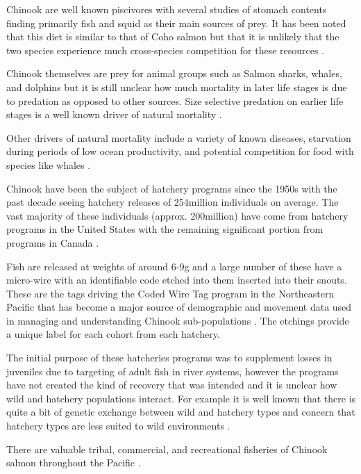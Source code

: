 \documentclass[11pt]{article}
\begin{document}
Chinook are well known piscivores with several studies of stomach contents finding primarily fish and squid as their main sources of prey. It has been noted that this diet is similar to that of Coho salmon but that it is unlikely that the two species experience much cross-species competition for these resources \cite{oceanchinook}. 

Chinook themselves are prey for animal groups such as Salmon sharks, whales, and dolphins but it is still unclear how much mortality in later life stages is due to predation as opposed to other sources. Size selective predation on earlier life stages is a well known driver of natural mortality \cite{oceanchinook}. 

Other drivers of natural mortality include a variety of known diseases, starvation during periods of low ocean productivity, and potential competition for food with species like whales \cite{oceanchinook}.\newline

Chinook have been the subject of hatchery programs since the 1950s with the past decade seeing hatchery releases of 254million individuals on average. The vast majority of these individuals (approx. 200million) have come from hatchery programs in the United States with the remaining significant portion from programs in Canada \cite{oceanchinook}. 

Fish are released at weights of around 6-9g and a large number of these have a micro-wire with an identifiable code etched into them inserted into their snouts. These are the tags driving the Coded Wire Tag program in the Northeastern Pacific that has become a major source of demographic and movement data used in managing and understanding Chinook sub-populations \cite{shelton2019}. The etchings provide a unique label for each cohort from each hatchery. 

The initial purpose of these hatcheries programs was to supplement losses in juveniles due to targeting of adult fish in river systems, however the programs have not created the kind of recovery that was intended and it is unclear how wild and hatchery populations interact. For example it is well known that there is quite a bit of genetic exchange between wild and hatchery types and concern that hatchery types are less suited to wild environments \cite{oceanchinook}. \newline

There are valuable tribal, commercial, and recreational fisheries of Chinook salmon throughout the Pacific \cite{salmonplan}.
\end{document}
